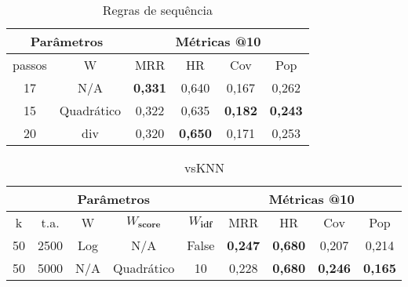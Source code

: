 \begin{table}[htbp]
  \centering
  \begin{tabular}{|c|c|c|c|c|c|}
    \hline
      \multicolumn{2}{|c|}{Parâmetros} & \multicolumn{4}{c|}{Métricas @10} \\
      \hline
      passos & W & MRR & HR & Cov & Pop \\
      \hline
      17 & N/A & \textbf{0,331} & 0,640 & 0,167 & 0,262 \\
      \hline
      15 & Quadrático & 0,322 & 0,635 & \textbf{0,182} & \textbf{0,243} \\
      \hline
      20 & div & 0,320 & \textbf{0,650} & 0,171 & 0,253 \\
      \hline

\end{tabular}
      \caption{Regras de sequência}
      \label{opt:sr_last}
\end{table}

\begin{table}[htbp]
  \centering
  \begin{tabular}{|c|c|c|c|c|c|c|c|c|}
    \hline
      \multicolumn{5}{|c|}{Parâmetros} & \multicolumn{4}{c|}{Métricas @10} \\
      \hline
      k & t.a. & W & $W_{\textbf{score}}$ & $W_{\textbf{idf}}$ & MRR & HR & Cov & Pop \\
      \hline
      50 & 2500 & Log & N/A & False & \textbf{0,247} & \textbf{0,680} & 0,207 & 0,214\\
      \hline
      50 & 5000 & N/A & Quadrático & 10 & 0,228 & \textbf{0,680} & \textbf{0,246} & \textbf{0,165}\\
      \hline
\end{tabular}
      \caption{vsKNN}
      \label{opt:vsknn_last}
\end{table}

